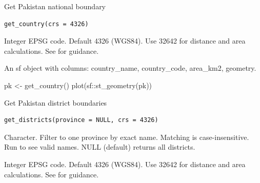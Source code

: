 \documentclass[a4paper]{book}
\begin{document}
%
\begin{Description}
Get Pakistan national boundary
\end{Description}
%
\begin{Usage}
\begin{verbatim}
get_country(crs = 4326)
\end{verbatim}
\end{Usage}
%
\begin{Arguments}
\begin{ldescription}
\item[\code{crs}] Integer EPSG code. Default 4326 (WGS84). Use 32642 for
distance and area calculations. See  for guidance.
\end{ldescription}
\end{Arguments}
%
\begin{Value}
An sf object with columns: country\_name, country\_code,
area\_km2, geometry.
\end{Value}
%
\begin{Examples}
\begin{ExampleCode}

  pk <- get_country()
  plot(sf::st_geometry(pk))

\end{ExampleCode}
\end{Examples}
%
\begin{Description}
Get Pakistan district boundaries
\end{Description}
%
\begin{Usage}
\begin{verbatim}
get_districts(province = NULL, crs = 4326)
\end{verbatim}
\end{Usage}
%
\begin{Arguments}
\begin{ldescription}
\item[\code{province}] Character. Filter to one province by exact name.
Matching is case-insensitive. Run 
to see valid names. NULL (default) returns all districts.

\item[\code{crs}] Integer EPSG code. Default 4326 (WGS84). Use 32642 for
distance and area calculations. See  for guidance.
\end{ldescription}
\end{Arguments}
\end{document}
